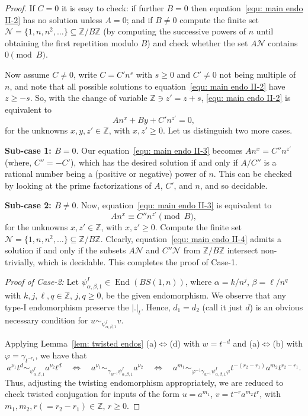 \documentclass[a4paper]{amsart}
\theoremstyle{definition}
\newcommand\ZZ{\mathbb{Z}}
\newcommand{\End}{\operatorname{End}}
\begin{document}
\begin{proof}
If $C=0$ it is easy to check: if further $B=0$ then equation~\eqref{equ: main endo II-2} has no solution unless $A=0$; and if $B\neq 0$ compute the finite set $\mathcal{N}=\{1,n,n^2, \ldots \}\subseteq \ZZ/B\ZZ$ (by computing the successive powers of $n$ until obtaining the first repetition modulo $B$) and check whether the set $A\mathcal{N}$ contains $0 \pmod{B}$.

Now assume $C\neq 0$, write $C=C' n^s$ with $s\geq 0$ and $C'\neq 0$ not being multiple of $n$, and note that all possible solutions to equation~\eqref{equ: main endo II-2} have $z \geq -s$. So, with the change of variable $\ZZ \ni z'=z+s$, \eqref{equ: main endo II-2} is equivalent to 
  \begin{equation}\label{equ: main endo II-3}
 An^x +By + C'n^{z'} =0,
  \end{equation}
 for the unknowns $x,y,z'\in \ZZ$, with $x, z'\geq 0$. Let us distinguish two more cases. 

\textbf{Sub-case 1: $B=0$}. Our equation~\eqref{equ: main endo II-3} becomes $An^x=C'' n^{ z'}$ (where, $C'' = - C'$), which has the desired solution if and only if $A/C''$ is a rational number being a (positive or negative) power of $n$. This can be checked by looking at the prime factorizations of $A$, $C'$, and $n$, and so decidable.

\textbf{Sub-case 2: $B\neq 0$}. Now, equation~\eqref{equ: main endo II-3} is equivalent to 
  \begin{equation}\label{equ: main endo II-4}
 An^x \equiv C''n^{ z'} \pmod{B},
 \end{equation}
 for the unknowns $x,z'\in \ZZ$, with $x,z'\geq 0$. Compute the finite set $\mathcal{N}=\{1,n,n^2, \ldots \}\subseteq \ZZ/B\ZZ$. Clearly, equation~\eqref{equ: main endo II-4} admits a solution if and only if the subsets $A\mathcal{N}$ and $C''\mathcal{N}$ from $\ZZ/B\ZZ$ intersect non-trivially, which is  decidable. This completes the proof of Case-1.

\noindent
\textit{Proof of Case-2:} Let $\psi^{I}_{\alpha, \beta, 1} \in \End(BS(1,n))$, where $\alpha = k/n^j$, $\beta= \ell/ n^q$ with $k, j, \ell, q \in \ZZ$, $j, q \geq 0$, be the given endomorphism. We observe that any type-I endomorphism preserve the $|.|_t$. Hence, $d_1=d_2$ (call it just $d$) is an obvious necessary condition for $u \sim_{\psi^{I}_{\alpha, \beta, 1}} v$. 

Applying Lemma~\ref{lem: twisted endos} (a)$\Leftrightarrow$(d) with $w=t^{-d}$ and (a)$\Leftrightarrow$(b) with $\varphi=\gamma_{t^{-r_1}}$, we have that 
 $$
a^{\nu_1}t^d \sim_{\psi^I_{\alpha, \beta, 1}} a^{\nu_2}t^d \quad \Leftrightarrow \quad a^{\nu_1} \sim_{\gamma_{w^{-1}}\psi^I_{\alpha, \beta,1}} a^{\nu_2} \quad \Leftrightarrow \quad a^{m_1} \sim_{\varphi^{-1}\gamma_{w^{-1}}\psi^I_{\alpha, \beta, 1}\varphi} t^{-(r_2-r_1)}a^{m_2}t^{r_2-r_1}.
 $$
Thus, adjusting the twisting endomorphism appropriately, we are reduced to check twisted conjugation for inputs of the form $u=a^{m_1}$, $v=t^{-r}a^{m_2}t^{r}$, with $m_1, m_2, r (=r_2 - r_1)\in \ZZ$, $r\geq 0$.


\end{proof}
\end{document}
